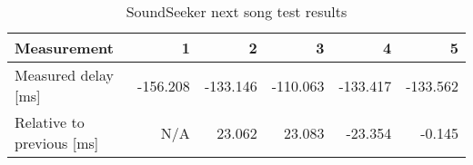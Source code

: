 \begin{table}[h]
\centering
\begin{tabular}{|l|r|r|r|r|r|}
\hline
Measurement                 & 1         & 2        & 3        & 4        & 5         \\ \hline
Measured delay [ms]         & -156.208  & -133.146 & -110.063 & -133.417 & -133.562  \\ \hline
Relative to previous [ms]   & N/A       & 23.062   & 23.083   & -23.354   & -0.145    \\ \hline
\end{tabular}
\caption{SoundSeeker next song test results}
\label{fig:ampmenextsongfigure}
\end{table}
